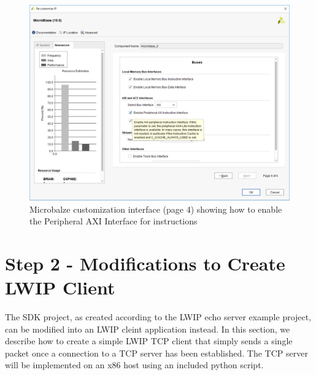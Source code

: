 \documentclass[11pt]{article}
\begin{document}
\begin{figure}[t]
\centering
\includegraphics[width=\textwidth]{mb_cust4.png}
\caption{Microbalze customization interface (page 4) showing how to enable the Peripheral AXI Interface for instructions}
\label{fig:mb_cust4}
\end{figure}

\section*{Step 2 - Modifications to Create LWIP Client}
The SDK project, as created according to the LWIP echo server example project, can be modified into an LWIP cleint application instead. In this section, we describe how to create a simple LWIP TCP client that simply sends a single packet once a connection to a TCP server has been established. The TCP server will be implemented on an x86 host using an included python script.
\end{document}
